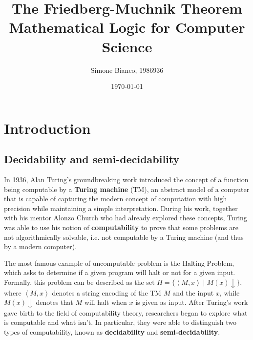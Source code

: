 \documentclass[12pt,a4paper]{article}
\theoremstyle{definition}
\newcommand{\abk}[1]{\left\langle#1\right\rangle}
\begin{document}
    \setlength{\parskip}{5pt}               %
    \setlength{\parindent}{0pt}             %

    \title{The Friedberg-Muchnik Theorem\\[0.2em]\smaller{}Mathematical Logic for Computer Science}
    \author{Simone Bianco, 1986936}
    \date{\today}
    
    \maketitle

    \hypersetup{linkcolor=black}
    \setlength{\parskip}{0pt}
    \tableofcontents
    \hypersetup{linkcolor=red}
    \setlength{\parskip}{5pt}

    \newpage

    \section{Introduction}

    \subsection{Decidability and semi-decidability}

    In 1936, Alan Turing's groundbreaking work introduced the concept of a function being computable by a \textbf{Turing machine} (TM), an abstract model of a computer that is capable of capturing the modern concept of computation with high precision while maintaining a simple interpretation. During his work, together with his mentor Alonzo Church who had already explored these concepts, Turing was able to use his notion of \textbf{computability} to prove that some problems are not algorithmically solvable, i.e. not computable by a Turing machine (and thus by a modern computer).
    
    The most famous example of uncomputable problem is the Halting Problem, which asks to determine if a given program will halt or not for a given input. Formally, this problem can be described as the set $H = \{\abk{M,x} \mid M(x) \downarrow\}$, where $\abk{M,x}$ denotes a string encoding of the TM $M$ and the input $x$, while $M(x) \downarrow$ denotes that $M$ will halt when $x$ is given as input. After Turing's work gave birth to the field of computability theory, researchers began to explore what is computable and what isn't. In particular, they were able to distinguish two types of computability, known as \textbf{decidability} and \textbf{semi-decidability}.
    
\end{document}
